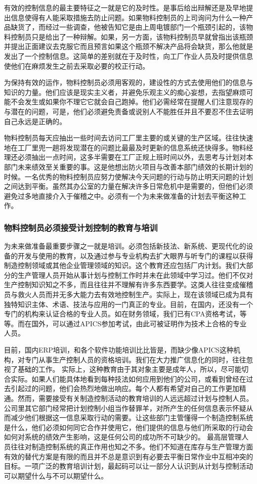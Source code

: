     有效的控制信息的最主要特征之一就是它的及时性。是事后给出辩解还是及早地提出信息使得有人能采取措施去防止问题。如果物料控制员的上司询问为什么一种产品缺货了，而经过一些调查，他被告知它是由上周电镀部门一个瓶颈引起的，该物料控制员只是给出了一种辩解。如果，另一方面，该物料控制员早就曾指出该瓶颈并提出正面建议去克服它而且预言如果这个瓶颈不解决产品将会缺货，那么他就是发出了一个控制信息。这简单的差别就在于及时性，向工厂作业人员及时提供信息使他们在麻烦发生之前去采取必要的校正行动。

    为保持有效的运作，物料控制员必须用客观的，建设性的方式去使用他们的信息与知识的力量。他们应该是现实主义者，并避免乐观主义的痴心妄想，去指望麻烦可能不会发生或如果你不理它它就会自己跑掉。他们必需经常在提醒人们注意现存的与潜在的问题，可是，他们必须避免责备或说别人不能胜任并且不要忍不住去证明自己永远是正确的。

    物料控制员每天应抽出一些时间去访问工厂里主要的或关键的生产区域。往往快速地在工厂里兜一趟将发现潜在的问题比最最及时更新的信息系统还快得多。物料经理还必须抽出一点时间，这多半需要在工厂正规上班时间以外，去思考与计划对本部门未来绩效至关重要的事。这是他想出防火项目与改善本部门绩效的长期计划的时候。一名优秀的物料控制员应努力使解决今天问题的行动与防止明天问题的计划之间达到平衡。虽然其办公室的力量在解决许多日常危机中是需要的，但他们必须避免过多地直接介入于催稽之中。必须有一个为未来做准备的计划去平衡这种工作。

\subsubsection {物料控制员必须接受计划控制的教育与培训}

    为未来做准备最重要步骤之一就是培训。必须包括新技法、新系统、更现代化的设备的开发与使用的教育，以及通过参与专业机构去扩大眼界与听专门的课程以获得制造控制领域或其他企业管理领域的知识。这个教育还应包括厂内计划。我们大部分的生产管理人员开始从事计划与控制工作时并未在此领域中学习过。他们不仅对生产控制知识知之不多，而且往往并不理解有许多东西要学。这类人往往变成催稽员与救火人员而并无多大能力去有效地控制生产。实际上，现在该领域已成为具有独特知识主体、术语、技法与应用的一门真正的专业。目前，在国内，还没有一个专门的机构来认证合格的专业人员。如在财务领域，我们已有CPA资格考试，等等。而在国外，可以通过APICS参加考试，由此可被证明作为技术上合格的专业人员。

    目前，国内ERP培训，和各个软件功能培训比比皆是，而缺少像APICS这种机构，对专门从事生产控制人员的资格培训。我们在大力推广信息化的同时，往往忽视了基础的工作。 实际上，这种教育由于其对象主要是成年人，所以，尽可能切合实际。如果人们能具体地看到每种技法如何应用到他们的公司，或看到曾经在过去引起过的问题，他们会热烈地做出响应。每个人都有希望对自己的工作更加精通。然而，需要接受有关制造控制活动的教育培训的人远远超过计划与控制人员。公司里其它部门经常把计划控制小组当作替罪羊，对所产生的任何信息表示怀疑从而减少他们根据这一信息采取行动的需要。让这些部门主管懂得一个制造控制系统是什么，他们必须如何同它合作并使用它，他们提供的信息与他们所采取的行动会如何对系统的绩效产生影响，这是任何公司的成功所不可缺少的。 最高层管理人员往往对制造控制系统的真正作用也知之不多。他们不知道在库存与生产管理方面有效的替代方案是有限的而且并不总是意识到有必要去平衡日常作业中互相冲突的目标。一项广泛的教育培训计划，最起码可以让一部分人认识到从计划与控制活动可以期望什么与不可以期望什么。

